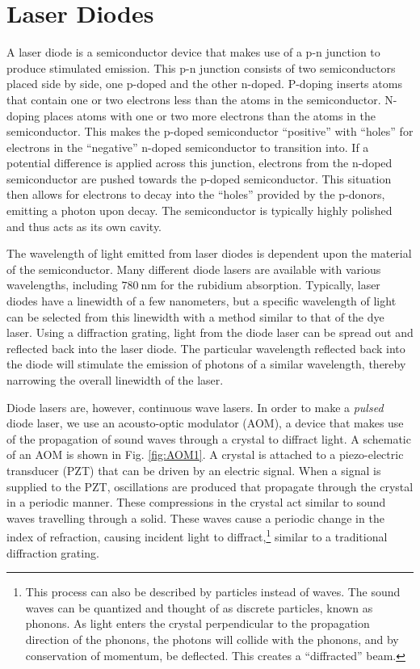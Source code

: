 
\section{Laser Diodes}
A laser diode is a semiconductor device that makes use of a p-n junction to produce stimulated emission. This p-n junction consists of two semiconductors placed side by side, one p-doped and the other n-doped. P-doping inserts atoms that contain one or two electrons less than the atoms in the semiconductor. N-doping places atoms with one or two more electrons than the atoms in the semiconductor. This makes the p-doped semiconductor ``positive'' with ``holes'' for electrons in the ``negative'' n-doped semiconductor to transition into. If a potential difference is applied across this junction, electrons from the n-doped semiconductor are pushed towards the p-doped semiconductor. This situation then allows for electrons to decay into the ``holes'' provided by the p-donors, emitting a photon upon decay. The semiconductor is typically highly polished and thus acts as its own cavity.


The wavelength of light emitted from laser diodes is dependent upon the material of the semiconductor. Many different diode lasers are available with various wavelengths, including $\SI{780}{\nano\meter}$ for the rubidium absorption. Typically, laser diodes have a linewidth of a few nanometers, but a specific wavelength of light can be selected from this linewidth with a method similar to that of the dye laser. Using a diffraction grating, light from the diode laser can be spread out and reflected back into the laser diode. The particular wavelength reflected back into the diode will stimulate the emission of photons of a similar wavelength, thereby narrowing the overall linewidth of the laser.

Diode lasers are, however, continuous wave lasers. In order to make a \textit{pulsed} diode laser, we use an acousto-optic modulator (AOM), a device that makes use of the propagation of sound waves through a crystal to diffract light. A schematic of an AOM is shown in Fig. \ref{fig:AOM1}. A crystal is attached to a piezo-electric transducer (PZT) that can be driven by an electric signal. When a signal is supplied to the PZT, oscillations are produced that propagate through the crystal in a periodic manner. These  compressions in the crystal act similar to sound waves travelling through a solid. These waves cause a periodic change in the index of refraction, causing incident light to diffract,\footnote{This process can also be described by particles instead of waves. The sound waves can be quantized and thought of as discrete particles, known as phonons. As light enters the crystal perpendicular to the propagation direction of the phonons, the photons will collide with the phonons, and by conservation of momentum, be deflected. This creates a ``diffracted'' beam.} similar to a traditional diffraction grating.

